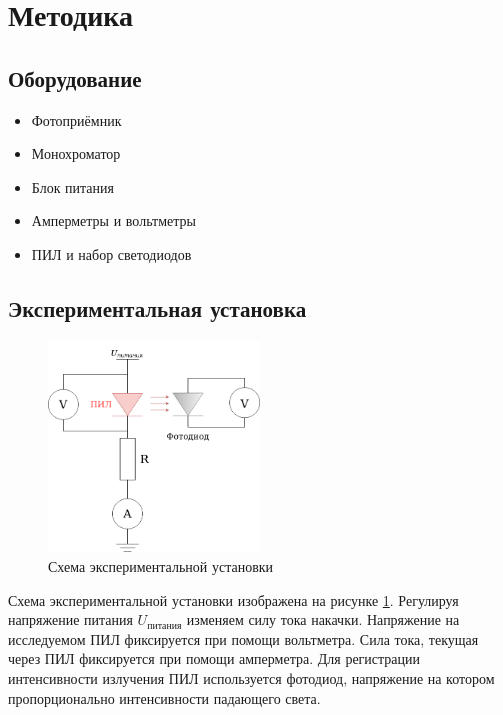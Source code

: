\documentclass[a4paper, 12pt]{extarticle}
\begin{document}
\section*{\textcolor{header}{Методика}}

\subsection*{\textcolor{sub_header}{Оборудование}}
\begin{itemize}
    \item Фотоприёмник
    \item Монохроматор
    \item Блок питания
    \item Амперметры и вольтметры
    \item ПИЛ и набор светодиодов
\end{itemize}

\subsection*{\textcolor{sub_header}{Экспериментальная установка}}


\begin{figure}[htbp]
    \centering
    \includegraphics[width = 0.5\textwidth]{scheme.png}
    \caption{Схема экспериментальной установки}
    \label{fig:setup}
\end{figure}

Схема экспериментальной установки изображена на рисунке \ref{fig:setup}. Регулируя напряжение питания $U_{\text{питания}}$ изменяем силу тока накачки. Напряжение на исследуемом ПИЛ фиксируется при помощи вольтметра. Сила тока, текущая через ПИЛ фиксируется при помощи амперметра. Для регистрации интенсивности излучения ПИЛ используется фотодиод, напряжение на котором пропорционально интенсивности падающего света.
\end{document}
